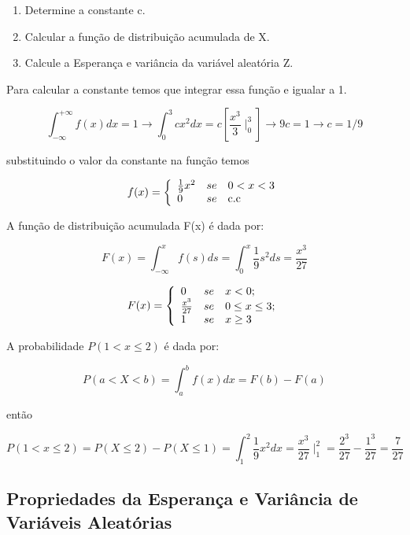 \documentclass[a4paper,12pt]{report}
\begin{document}
{\begin{enumerate}
    \item Determine a constante c.
    \item Calcular a função de distribuição acumulada de X.
    \item Calcule a Esperança e variância da variável aleatória Z.
\end{enumerate}

Para calcular a constante temos que integrar essa função e igualar
a 1.

$$
\int_{-\infty}^{+\infty}f(x)dx = 1 \rightarrow
\int_{0}^{3}cx^{2}dx = c\left[\frac{x^{3}}{3}\mid^{3}_{0}\right]
\rightarrow 9c = 1 \rightarrow c = 1/9
$$

substituindo o valor da constante na função temos

$$
f(x)=
\left\{%
\begin{array}{ll}
   \frac{1}{9}x^{2}      & se \quad \hbox{$0 < x < 3$} \\
   0           & se \quad \hbox{c.c} \\
\end{array}%
\right.
$$

A função de distribuição acumulada F(x) é dada por:

$$
F(x) = \int^{x}_{-\infty}f(s)ds = \int^{x}_{0}\frac{1}{9}s^{2}ds =
\frac{x^{3}}{27}
$$

$$
F(x)=
\left\{%
\begin{array}{ll}
    0                 & se \quad \hbox{$x < 0$;} \\
   \frac{x^{3}}{27}   & se \quad \hbox{$0 \leq x \leq 3$;} \\
   1                  & se \quad \hbox{$x \geq 3$} \\
\end{array}%
\right.
$$

A probabilidade $P(1 < x \leq 2)$ é dada por:

$$
P(a < X < b)=\int^{b}_{a}f(x)dx = F(b)-F(a)
$$

então

$$P(1 < x \leq 2) = P(X \leq 2) - P(X \leq 1) = \int^{2}_{1}\frac{1}{9}x^{2}dx = \frac{x^{3}}{27}\mid^{2}_{1}=
\frac{2^{3}}{27}-\frac{1^{3}}{27}=\frac{7}{27}$$



\subsection{Propriedades da Esperança e Variância de Variáveis Aleatórias}

}
\end{document}
